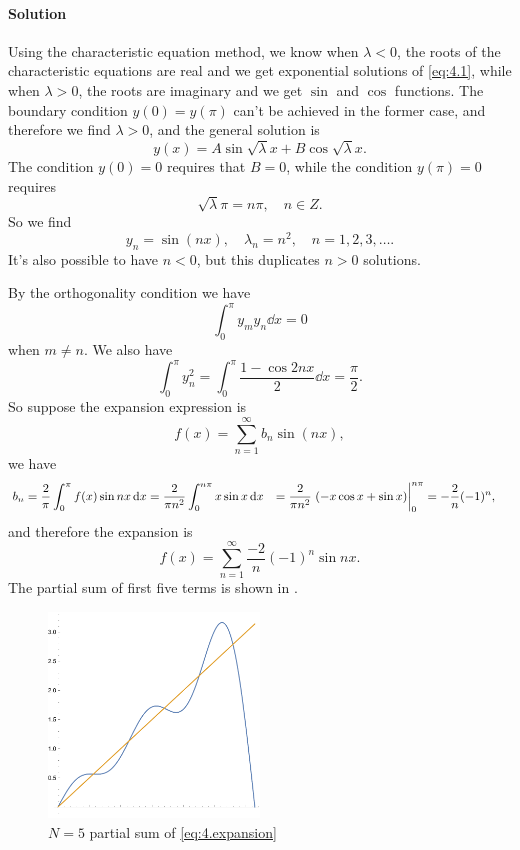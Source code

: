 \documentclass[hyperref, a4paper]{article}
\def\\{}%
\def\mathbb#1{#1}%
\begin{document}
\paragraph*{Solution} Using the characteristic equation method,
we know when $\lambda < 0$,
the roots of the characteristic equations are real and 
we get exponential solutions of \eqref{eq:4.1},
while when $\lambda > 0$,
the roots are imaginary and
we get $\sin$ and $\cos$ functions.
The boundary condition $y(0) = y(\pi)$ can't be achieved in the former case,
and therefore we find $\lambda > 0$,
and the general solution is 
\[
    y(x) = A \sin \sqrt{\lambda} x + B \cos \sqrt{\lambda} x.
\]
The condition $y(0) = 0$ requires that $B = 0$,
while the condition $y(\pi) = 0$ requires 
\[
    \sqrt{\lambda} \pi = n \pi, \quad n \in \mathbb{Z}.
\]
So we find 
\begin{equation}
    y_n = \sin (n x), \quad \lambda_n = n^2, \quad 
    n = 1, 2, 3, \ldots.
\end{equation}
It's also possible to have $n < 0$,
but this duplicates $n > 0$ solutions.

By the orthogonality condition we have 
\[
    \int_{0}^{\pi} y_m y_n \dd{x} = 0
\]
when $m \neq n$.
We also have 
\[
    \int_{0}^{\pi} y_n^2 = \int_{0}^{\pi} \frac{1 - \cos 2 n x}{2} \dd{x} = \frac{\pi}{2}.
\]
So suppose the expansion expression is 
\begin{equation}
    f(x) = \sum_{n=1}^{\infty} b_n \sin(n x), 
\end{equation}
we have 
\begin{equation}
    \begin{aligned}
        b_n &= \frac{2}{\pi} \int_{0}^{\pi} f(x) \sin n x \dd{x}
        = \frac{2}{\pi n^2} \int_{0}^{n \pi} x \sin x \dd{x} \\
        &= \frac{2}{\pi n^2} \eval{(- x \cos x + \sin x)}_{0}^{n \pi} \\
        &= - \frac{2}{n} (-1)^n,
    \end{aligned}
\end{equation}
and therefore the expansion is
\begin{equation}
    f(x) = \sum_{n=1}^{\infty} \frac{-2}{n} (-1)^n \sin nx.
    \label{eq:4.expansion}
\end{equation}
The partial sum of first five terms is shown in 
.

\begin{figure}
    \centering
    \includegraphics[width=0.5\textwidth]{plots/x-fourier-series-1.pdf}
    \caption{$N = 5$ partial sum of \eqref{eq:4.expansion}}
    \label{fig:partial-sum}
\end{figure}
\end{document}

